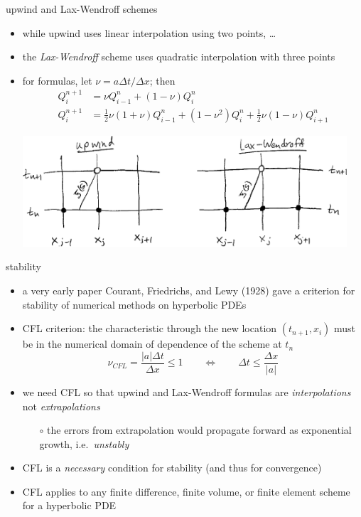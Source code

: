 \documentclass[10pt,dvipsnames,usepdftitle=false,
hyperref={pdftitle = {Finite volume methods},
    pdfauthor = {Ed Bueler}}]{beamer}
\begin{document}
\begin{frame}{upwind and Lax-Wendroff schemes}

\begin{itemize}
\item while upwind uses linear interpolation using two points, \dots
\item the \emph{Lax-Wendroff} scheme uses quadratic interpolation with three points
\item for formulas, let $\nu = a\Delta t/\Delta x$; then
\begin{align*}
Q_i^{n+1} &= \nu Q_{i-1}^n + \left(1 - \nu\right) Q_i^n \\
Q_i^{n+1} &= \tfrac{1}{2} \nu (1+\nu) Q_{i-1}^n + \left(1 - \nu^2\right) Q_i^n + \tfrac{1}{2} \nu (1-\nu) Q_{i+1}^n
\end{align*}

\begin{center}
\includegraphics[width=0.95\textwidth]{figs/stencilssketch}
\end{center}
\end{itemize}
\end{frame}


\begin{frame}{stability}

\begin{itemize}
\item a very early paper Courant, Friedrichs, and Lewy (1928) gave a criterion for stability of numerical methods on hyperbolic PDEs
\item \alert{CFL criterion:} the characteristic through the new location $(t_{n+1},x_i)$ must be in the numerical domain of dependence of the scheme at $t_n$
    $$\nu_{CFL} = \frac{|a|\Delta t}{\Delta x} \le 1 \qquad \iff \qquad \Delta t \le \frac{\Delta x}{|a|}$$

\item we need CFL so that upwind and Lax-Wendroff formulas are \emph{interpolations} not \emph{extrapolations}
    \begin{itemize}
    \item[$\circ$] the errors from extrapolation would propagate forward as exponential growth, i.e.~\emph{unstably}
    \end{itemize}
\item CFL is a \emph{necessary} condition for stability (and thus for convergence)
\item CFL applies to any finite difference, finite volume, or finite element scheme for a hyperbolic PDE
\end{itemize}
\end{frame}
\end{document}
